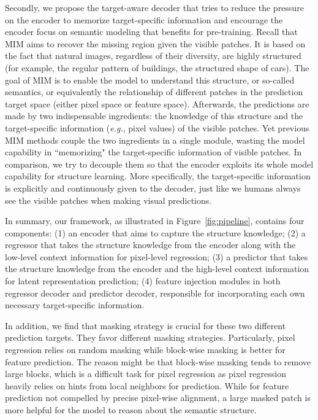 \documentclass[runningheads]{llncs}
\begin{document}
Secondly, we propose the target-aware decoder that tries to reduce the pressure on the
encoder to memorize target-specific information and encourage the encoder focus on semantic modeling that benefits for pre-training.
Recall that MIM aims to recover the missing region given the visible patches. It is based on the fact that natural images, regardless of their diversity, are highly structured (for example, the regular pattern of buildings, the structured shape of cars). The goal of MIM is to enable the model to understand this structure, or so-called semantics, or equivalently the relationship of different patches in the prediction target space (either pixel space or feature space).
Afterwards, the predictions are made by two indispensable ingredients: the knowledge of this structure and the target-specific information (\emph{e.g.}, pixel values) of the visible patches.
Yet previous MIM methods couple the two ingredients in a single module, wasting the model capability in ``memorizing" the target-specific information of visible patches.
In comparison, we try to decouple them so that the encoder exploits its whole model capability for structure learning. More specifically, the target-specific information is explicitly and continuously given to the decoder, just like we humans always see the visible patches when making visual predictions.

In summary,
our framework, as illustrated in Figure~\ref{fig:pipeline}, contains four components: (1) an encoder that aims to capture the structure knowledge; (2) a regressor that takes the structure knowledge from the encoder along with the low-level context information for pixel-level regression; (3) a predictor that takes the structure knowledge from the encoder and the high-level context information for latent representation prediction; (4) feature injection modules in both regressor decoder and predictor decoder, responsible for incorporating each own necessary target-specific information.

In addition, we find that masking strategy is crucial for these two different prediction targets. They favor different masking strategies. Particularly, pixel regression relies on random masking while block-wise masking is better for feature prediction.
The reason might be that block-wise masking tends to remove large blocks, which is a difficult task
for pixel regression as pixel regression heavily relies on hints from local neighbors for prediction.
While for feature prediction not compelled by precise pixel-wise alignment, a large masked patch is more helpful for the model to reason about the semantic structure.
\end{document}
